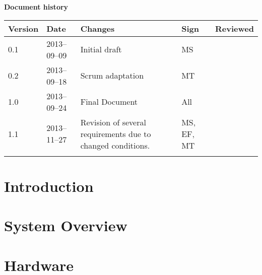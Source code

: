 \documentclass[10pt, a4paper, twoside]{article}
\numberwithin{equation}{subsection}
\numberwithin{figure}{section}
\numberwithin{table}{section}
\begin{document}



\newpage
\pagestyle{fancy}
\setcounter{page}{2} %



\newpage
\tableofcontents
\listoffigures


\newpage
\vspace*{5\baselineskip}

\begin{center}
\textbf{\LARGE Document history}

{ \footnotesize 
\begin{tabular}{|p{1cm}|p{2.0cm}|p{5cm}|p{1.5cm}|p{2cm}|}
	\hline
	\textbf{Version} & \textbf{Date} & \textbf{Changes} & \textbf{Sign} & \textbf{Reviewed} \\
	
	\hline
	0.1 & 2013--09--09 & Initial draft & MS & \\
	\hline
	0.2 & 2013--09--18 & Scrum adaptation & MT & \\
	\hline
	1.0 & 2013--09--24 & Final Document & All & \\
	\hline
	1.1 & 2013--11--27 & Revision of several requirements due to changed conditions. & MS, EF, MT & \\
	
	\hline
	 &  &  &  &  \\
	
	\hline
\end{tabular}
}
\end{center}



%
%
\newpage
{}


\newpage
\section{Introduction}
\label{sec:introduction}


\newpage
\section{System Overview}
\label{sec:system_overview}


\newpage
\section{Hardware}
\label{sec:hardware}

\end{document}
